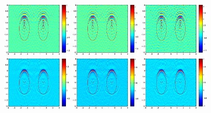 {\begin{figure}[htbp]
	\centering
	\includegraphics[width=0.32\textwidth]{./Img/graphic/bi_circle_4pi_error2.eps}
	\includegraphics[width=0.32\textwidth]{./Img/graphic/bi_circle_4pi_error4.eps}
	\includegraphics[width=0.32\textwidth]{./Img/graphic/bi_circle_4pi_error6.eps}
	\includegraphics[width=0.32\textwidth]{./Img/graphic/bi_circle_multi_2_8_error2.eps}
	\includegraphics[width=0.32\textwidth]{./Img/graphic/bi_circle_multi_2_8_error4.eps}
	\includegraphics[width=0.32\textwidth]{./Img/graphic/bi_circle_multi_2_8_error6.eps}
	

\end{figure}}
